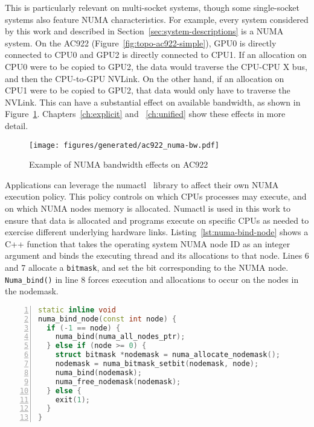 This is particularly relevant on multi-socket systems, though some single-socket systems also feature NUMA characteristics.
For example, every system considered by this work and described in Section~\ref{sec:system-descriptions} is a NUMA system.
On the AC922 (Figure~\ref{fig:topo-ac922-simple}), GPU0 is directly connected to CPU0 and GPU2 is directly connected to CPU1.
If an allocation on CPU0 were to be copied to GPU2, the data would traverse the CPU-CPU X bus, and then the CPU-to-GPU NVLink.
On the other hand, if an allocation on CPU1 were to be copied to GPU2, that data would only have to traverse the NVLink.
This can have a substantial effect on available bandwidth, as shown in Figure~\ref{fig:numa-bw-example}.
Chapters~\ref{ch:explicit} and ~\ref{ch:unified} show these effects in more detail.

\begin{figure}[H]
    \centering
	\texttt{[image: figures/generated/ac922\_numa-bw.pdf]}
    \caption[Example of NUMA bandwidth effects on AC922]{Example of NUMA bandwidth effects on AC922}
    \label{fig:numa-bw-example}
\end{figure}

Applications can leverage the numactl~\cite{wickman2015numactl} library to affect their own NUMA execution policy.
This policy controls on which CPUs processes may execute, and on which NUMA nodes memory is allocated.
Numactl is used in this work to ensure that data is allocated and programs execute on specific CPUs as needed to exercise different underlying hardware links.
Listing~\ref{lst:numa-bind-node} shows a C++ function that takes the operating system NUMA node ID as an integer argument and binds the executing thread and its allocations to that node.
Lines 6 and 7 allocate a \texttt{bitmask}, and set the bit corresponding to the NUMA node.
\texttt{Numa\_bind()} in line 8 forces execution and allocations to occur on the nodes in the nodemask.

\begin{minipage}{\linewidth}
\begin{lstlisting}[language=C++, caption=Binding to NUMA nodes., label=lst:numa-bind-node, numbers=left]
static inline void 
numa_bind_node(const int node) {
  if (-1 == node) {
	numa_bind(numa_all_nodes_ptr);
  } else if (node >= 0) {
	struct bitmask *nodemask = numa_allocate_nodemask();
	nodemask = numa_bitmask_setbit(nodemask, node);
	numa_bind(nodemask);
	numa_free_nodemask(nodemask);
  } else {
	exit(1);
  }
}
\end{lstlisting}
\end{minipage}

